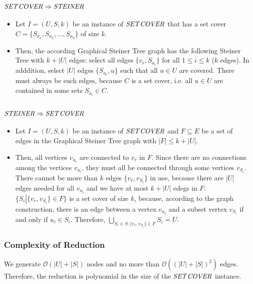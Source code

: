 \documentclass[12pt]{article}
\begin{document}
\subsubsection*{$\mathit{SET\-COVER} \Rightarrow \mathit{STEINER}$}
\begin{itemize}
	\item Let $I=(U, S, k)$ be an instance of $\mathit{SET\-COVER}$ that has a set cover $C=\{S_{a_1}, S_{a_2}, \ldots, S_{a_k}\}$ of size $k$.
	\item Then, the according Graphical Steiner Tree graph has the following Steiner Tree with $k+|U|$ edges: select all edges $\{v_r, S_{a_i}\}$ for all $1 
\leq i \leq k$ ($k$ edges). In adddition, select $|U|$ edges $\{S_{a_i}, u\}$ such that all $u \in U$ are covered. There must always be such edges, because $C$ is a set cover, i.e. all $u \in U$ are contained in some sets $S_{a_i} \in C$.
\end{itemize}

\subsubsection*{$\mathit{STEINER} \Rightarrow \mathit{SET\-COVER}$}
\begin{itemize}
	\item Let $I = (U, S, k)$ be an instance of $\mathit{SET\-COVER}$ and $F \subseteq E$ be a set of edges in the Graphical Steiner Tree graph with $|F| \leq k + |U|$.
	\item Then, all vertices $v_{u_i}$ are connected to $v_r$ in $F$. Since there are no connections among the vertices $v_{u_i}$, they must all be connected through some vertices $v_{S_i}$. There cannot be more than $k$ edges $\{v_r, v_{S_i}\}$ in use, because there are $|U|$ edges needed for all $v_{u_i}$ and we have at most $k + |U|$ edegs in $F$. $\{S_i \left.\right| \{v_r, v_{S_i}\} \in F\}$ is a set cover of size $k$, because, according to the graph construction, there is an edge between a vertex $v_{u_i}$ and a subset vertex $v_{S_i}$ if and only if $u_i \in S_i$. Therefore, $\bigcup_{S_i \in S: \{v_r, v_{S_i}\} \in F} S_i = U$.
\end{itemize}

\subsubsection*{Complexity of Reduction}
We generate $\mathcal{O}(|U| + |S|)$ nodes and no more than $\mathcal{O}((|U| + |S|)^2)$ edges. Therefore, the reduction is polynomial in the size of the $\mathit{SET\-COVER}$ instance.
\end{document}
